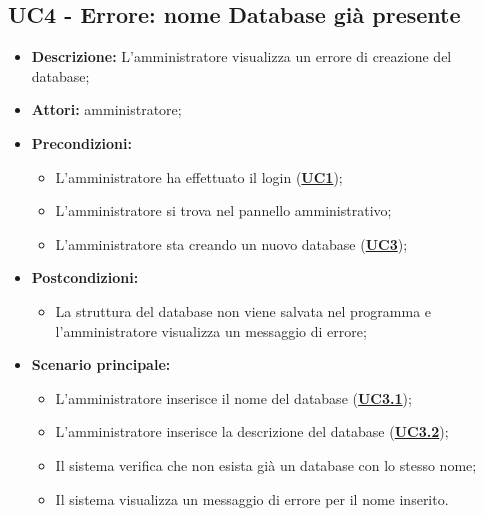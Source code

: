 \subsection{UC4 - Errore: nome Database già presente}
\label{sec:UC4}
\begin{itemize}
	\item \textbf{Descrizione:} L’amministratore visualizza un errore di creazione del database;
	\item \textbf{Attori:} amministratore;
	\item \textbf{Precondizioni:} 
	\begin{itemize}
		\item L’amministratore ha effettuato il login (\hyperref[sec:UC1]{\textbf{UC1}});
		\item L’amministratore si trova nel pannello amministrativo;
		\item L’amministratore sta creando un nuovo database (\hyperref[sec:UC3]{\textbf{UC3}});
	\end{itemize}
	\item \textbf{Postcondizioni:} 
	\begin{itemize}
		\item La struttura del database non viene salvata nel programma e l'amministratore visualizza un messaggio di errore;
	\end{itemize}
	\item \textbf{Scenario principale:} 
	\begin{itemize}
		\item L’amministratore inserisce il nome del database (\hyperref[sec:UC3.1]{\textbf{UC3.1}});
		\item L’amministratore inserisce la descrizione del database  (\hyperref[sec:UC3.2]{\textbf{UC3.2}});
		\item Il sistema verifica che non esista già un database con lo stesso nome;
		\item Il sistema visualizza un messaggio di errore per il nome inserito.
	\end{itemize}
\end{itemize}

